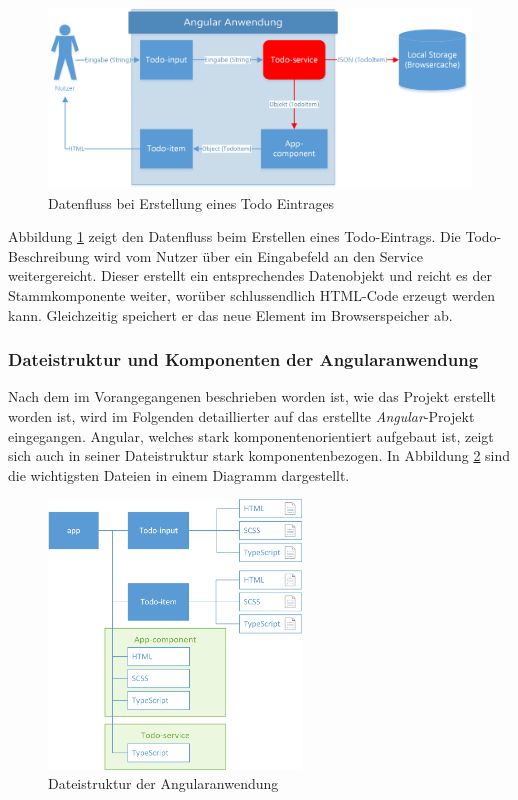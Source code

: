 \begin{figure}[h!]
	\includegraphics[width=\textwidth]{img/pwa_datenfluss_erstellen.png}
	\centering
	\caption{Datenfluss bei Erstellung eines Todo Eintrages}
	\label{fig:pwa_datenfluss_erstellen}
\end{figure}

Abbildung \ref{fig:pwa_datenfluss_erstellen} zeigt den Datenfluss beim Erstellen eines Todo-Eintrags. Die Todo-Beschreibung wird vom Nutzer über ein Eingabefeld an den Service weitergereicht. Dieser erstellt ein entsprechendes Datenobjekt und reicht es der Stammkomponente weiter, worüber schlussendlich HTML-Code erzeugt werden kann. Gleichzeitig speichert er das neue Element im Browserspeicher ab.

\subsubsection{Dateistruktur und Komponenten der Angularanwendung}
Nach dem im Vorangegangenen beschrieben worden ist, wie das Projekt erstellt worden ist, wird im Folgenden detaillierter auf das erstellte \textit{Angular}-Projekt eingegangen. Angular, welches stark komponentenorientiert aufgebaut ist, zeigt sich auch in seiner Dateistruktur stark komponentenbezogen. In Abbildung \ref{fig:pwa_dateistruktur} sind die wichtigsten Dateien in einem Diagramm dargestellt.

\begin{figure}[h!]
	\includegraphics[width=0.6\textwidth]{img/pwa_dateistruktur.png}
	\centering
	\caption{Dateistruktur der Angularanwendung}
	\label{fig:pwa_dateistruktur}
\end{figure}


